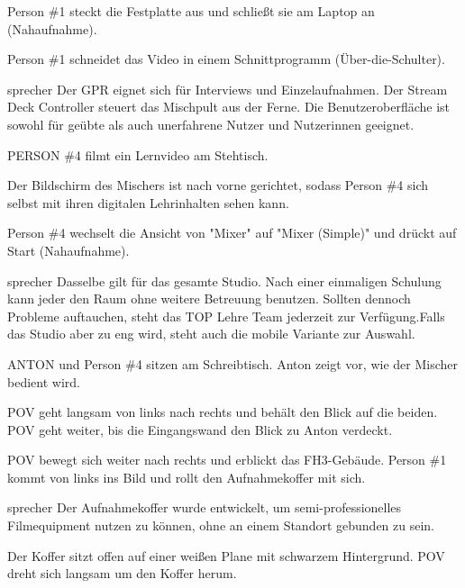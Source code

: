 \documentclass{screenplay}
\begin{document}
	Person \#1 steckt die Festplatte aus und schließt sie am Laptop an (Nahaufnahme).
	
	Person \#1 schneidet das Video in einem Schnittprogramm (Über-die-Schulter).
	
	\begin{dialogue}{sprecher}
		Der GPR eignet sich für Interviews und Einzelaufnahmen. Der Stream Deck Controller steuert das Mischpult aus der Ferne. Die Benutzeroberfläche ist sowohl für geübte als auch unerfahrene Nutzer und Nutzerinnen geeignet.
	\end{dialogue}
	
	PERSON \#4 filmt ein Lernvideo am Stehtisch.
	
	Der Bildschirm des Mischers ist nach vorne gerichtet, sodass Person \#4 sich selbst mit ihren digitalen Lehrinhalten sehen kann.
	
	Person \#4 wechselt die Ansicht von "Mixer" auf "Mixer (Simple)" und drückt auf Start (Nahaufnahme).
	
	\begin{dialogue}{sprecher}
		Dasselbe gilt für das gesamte Studio. Nach einer einmaligen Schulung kann jeder den Raum ohne weitere Betreuung benutzen. Sollten dennoch Probleme auftauchen, steht das TOP Lehre Team jederzeit zur Verfügung.Falls das Studio aber zu eng wird, steht auch die mobile Variante zur Auswahl.
	\end{dialogue}
	
	ANTON und Person \#4 sitzen am Schreibtisch. Anton zeigt vor, wie der Mischer bedient wird.
	
	POV geht langsam von links nach rechts und behält den Blick auf die beiden. POV geht weiter, bis die Eingangswand den Blick zu Anton verdeckt.
	
	
	POV bewegt sich weiter nach rechts und erblickt das FH3-Gebäude. Person \#1 kommt von links ins Bild und rollt den Aufnahmekoffer mit sich.
	
	\begin{dialogue}{sprecher}
		Der Aufnahmekoffer wurde entwickelt, um semi-professionelles Filmequipment nutzen zu können, ohne an einem Standort gebunden zu sein.
	\end{dialogue}
	
	
	Der Koffer sitzt offen auf einer weißen Plane mit schwarzem Hintergrund. POV dreht sich langsam um den Koffer herum.
	
\end{document}
